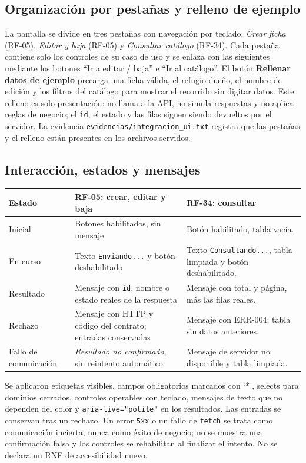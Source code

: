 \documentclass[11pt,a4paper]{article}
\newcommand{\code}[1]{\texttt{#1}}
\newcommand{\thead}[1]{\textbf{#1}}
\begin{document}
\subsection{Organización por pestañas y relleno de ejemplo}

La pantalla se divide en tres pestañas con navegación por teclado:
\emph{Crear ficha} (RF-05), \emph{Editar y baja} (RF-05) y
\emph{Consultar catálogo} (RF-34). Cada pestaña contiene solo los controles de
su caso de uso y se enlaza con las siguientes mediante los botones ``Ir a
editar / baja'' e ``Ir al catálogo''. El botón \textbf{Rellenar datos de ejemplo}
precarga una ficha válida, el refugio dueño, el nombre de edición y los filtros
del catálogo para mostrar el recorrido sin digitar datos. Este relleno es solo
presentación: no llama a la API, no simula respuestas y no aplica reglas de
negocio; el \code{id}, el estado y las filas siguen siendo devueltos por el
servidor. La evidencia \code{evidencias/integracion\_ui.txt} registra que las
pestañas y el relleno están presentes en los archivos servidos.

\subsection{Interacción, estados y mensajes}

{\footnotesize
\begin{tabularx}{\linewidth}{@{}V{0.42}V{1.28}V{1.30}@{}}
\toprule
\thead{Estado} & \thead{RF-05: crear, editar y baja} & \thead{RF-34: consultar} \\ \midrule
Inicial & Botones habilitados, sin mensaje &
Botón habilitado, tabla vacía. \\
En curso & Texto \code{Enviando...} y botón deshabilitado &
Texto \code{Consultando...}, tabla limpiada y botón deshabilitado. \\
Resultado & Mensaje con \code{id}, nombre o estado reales de la respuesta &
Mensaje con total y página, más las filas reales. \\
Rechazo & Mensaje con HTTP y código del contrato; entradas conservadas &
Mensaje con ERR-004; tabla sin datos anteriores. \\
Fallo de comunicación & \emph{Resultado no confirmado}, sin reintento automático &
Mensaje de servidor no disponible y tabla limpiada. \\
\bottomrule
\end{tabularx}
}

Se aplicaron etiquetas visibles, campos obligatorios marcados con `*', selects
para dominios cerrados, controles operables con teclado, mensajes de texto que
no dependen del color y \code{aria-live="polite"} en los resultados. Las
entradas se conservan tras un rechazo. Un error \code{5xx} o un fallo de
\code{fetch} se trata como comunicación incierta, nunca como éxito de negocio;
no se muestra una confirmación falsa y los controles se rehabilitan al finalizar
el intento. No se declara un RNF de accesibilidad nuevo.
\end{document}
